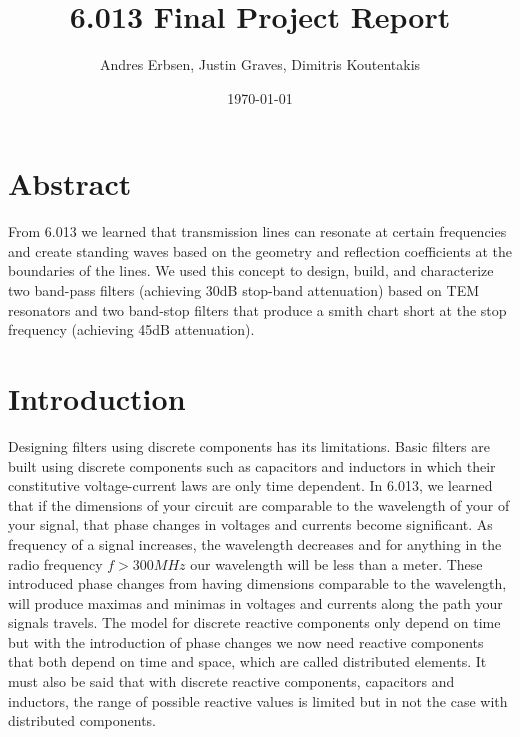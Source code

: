 \documentclass[letterpaper, 11pt, twocolumn]{article}
\begin{document}
\title{\vspace{-10mm} 6.013 Final Project Report}
\author{Andres Erbsen, Justin Graves, Dimitris Koutentakis}
\date{\today}
\maketitle
\vspace{5mm}
\section{Abstract}
From 6.013 we learned that transmission lines can resonate at certain
frequencies and create standing waves based on the geometry and reflection
coefficients at the boundaries of the lines. We used this concept to design,
build, and characterize two band-pass filters (achieving 30dB stop-band
attenuation) based on TEM resonators and two band-stop filters that produce a
smith chart short at the stop frequency (achieving 45dB attenuation).

\section {Introduction}
Designing filters using discrete components has its limitations. Basic filters are built using discrete components such as capacitors and inductors in which their constitutive voltage-current laws are only time dependent. In 6.013, we learned that if the dimensions of your circuit are comparable to the wavelength of your of your signal, that phase changes in voltages and currents become significant. As frequency of a signal increases, the wavelength decreases and for anything in the radio frequency $f > 300 MHz$ our wavelength will be less than a meter. These introduced phase changes from having dimensions comparable to the wavelength, will produce maximas and minimas in voltages and currents along the path your signals travels. The model for discrete reactive components only depend on time but with the introduction of phase changes we now need reactive components that both depend on time and space, which are called distributed elements. It must also be said that with discrete reactive components, capacitors and inductors, the range of possible reactive values is limited but in not the case with distributed components. 
\end{document}
